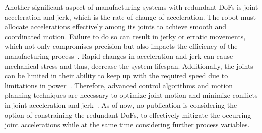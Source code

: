 









Another significant aspect of manufacturing systems with redundant \acrshort{DoF}s is joint acceleration and jerk, which is the rate of change of acceleration. The robot must allocate accelerations effectively among its joints to achieve smooth and coordinated motion. Failure to do so can result in jerky or erratic movements, which not only compromises precision but also impacts the efficiency of the manufacturing process~\cite{Duong.2021}. Rapid changes in acceleration and jerk can cause mechanical stress and thus, decrease the system lifespan. Additionally, the joints can be limited in their ability to keep up with the required speed due to limitations in power~\cite{Staff.1988}. Therefore, advanced control algorithms and motion planning techniques are necessary to optimize joint motion and minimize conflicts in joint acceleration and jerk~\cite{Duong.2021, Valente.2017}. As of now, no publication is considering the option of constraining the redundant \acrshort{DoF}s, to effectively mitigate the occurring joint accelerations while at the same time considering further process variables. 

